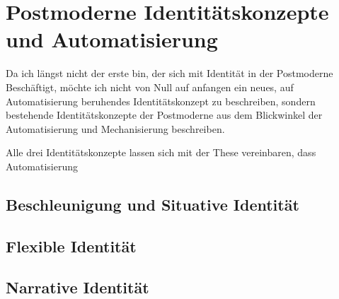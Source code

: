 \section{Postmoderne Identitätskonzepte und Automatisierung}

Da ich längst nicht der erste bin, der sich mit Identität in der Postmoderne Beschäftigt, möchte ich nicht von Null auf anfangen ein neues, auf Automatisierung beruhendes Identitätskonzept zu beschreiben, sondern bestehende Identitätskonzepte der Postmoderne aus dem Blickwinkel der Automatisierung und Mechanisierung beschreiben.

Alle drei Identitätskonzepte lassen sich mit der These vereinbaren, dass Automatisierung 

\subsection{Beschleunigung und Situative Identität}

\subsection{Flexible Identität}

\subsection{Narrative Identität}
